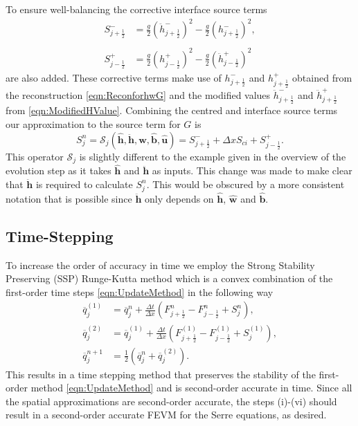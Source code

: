 \documentclass[times]{elsarticle}
\newcommand{\vecn}[1]{\boldsymbol{#1}}
\begin{document}
To ensure well-balancing the corrective interface source terms
\begin{align*}
S^{-}_{j + \frac{1}{2}} &=  \frac{g}{2} \left(\ddot{h}^{-}_{j + \frac{1}{2}} \right)^2 - \frac{g}{2} \left(h^{-}_{j + \frac{1}{2}} \right)^2, \\ \\
S^{+}_{j - \frac{1}{2}} &=  \frac{g}{2} \left(h^{+}_{j - \frac{1}{2}}\right)^2 - \frac{g}{2}\left(\ddot{h}^{+}_{j - \frac{1}{2}}\right)^2 
\end{align*}
are also added. These corrective terms make use of $h^{-}_{j + \frac{1}{2}}$ and $h^{+}_{j + \frac{1}{2}}$ obtained from the reconstruction \eqref{eqn:ReconforhwG} and the modified values $\ddot{h}^{-}_{j + \frac{1}{2}}$ and $\ddot{h}^{+}_{j + \frac{1}{2}}$ from \eqref{eqn:ModifiedHValue}. Combining the centred and interface source terms our approximation to the source term for $G$ is 
\begin{equation*}
S^n_j = \mathcal{S}_j\left( \vecn{\hat{h}},\vecn{\ddot{h}},\vecn{\hat{w}},\vecn{\hat{b}}, \vecn{\hat{u}}  \right)=   S^{-}_{j + \frac{1}{2}} + \Delta x S_{ci} + S^{+}_{j - \frac{1}{2}}.
\end{equation*}
This operator $\mathcal{S}_j$ is slightly different to the example given in the overview of the evolution step as it takes $\vecn{\hat{h}}$ and $\vecn{\ddot{h}}$ as inputs. This change was made to make clear that $\vecn{\ddot{h}}$ is required to calculate $S^n_j$. This would be obscured by a more consistent notation that is possible since $\vecn{\ddot{h}}$ only depends on $\vecn{\hat{h}}$, $\vecn{\hat{w}}$ and $\vecn{\hat{b}}$. 

\subsection{Time-Stepping}

To increase the order of accuracy in time we employ the Strong Stability Preserving (SSP) Runge-Kutta method \cite{Gottlieb-etal-2003-89} which is a convex combination of the first-order time steps \eqref{eqn:UpdateMethod} in the following way
\begin{subequations}
	\begin{align}
	\overline{q}_j^{(1)} &= \overline{q}^{n}_j + \frac{\Delta t}{\Delta x} \left(F^n_{j+\frac{1}{2}} - F^n_{j-\frac{1}{2}} + S^n_j\right),\\
	\overline{q}_j^{(2)} &= \overline{q}_j^{(1)} + \frac{\Delta t}{\Delta x} \left(F_{j+\frac{1}{2}}^{(1)} - F_{j-\frac{1}{2}}^{(1)}  + S_j^{(1)} \right), \\
	\overline{q}^{n+1}_j &= \frac{1}{2} \left( \overline{q}^n_j +  \overline{q}_j^{(2)}  \right).
	\end{align}
	\label{eqn:SSPRKStep1}
\end{subequations}
This results in a time stepping method that preserves the stability of the first-order method \eqref{eqn:UpdateMethod} and is second-order accurate in time. Since all the spatial approximations are second-order accurate, the steps (i)-(vi) should result in a second-order accurate FEVM for the Serre equations, as desired. 
\end{document}
